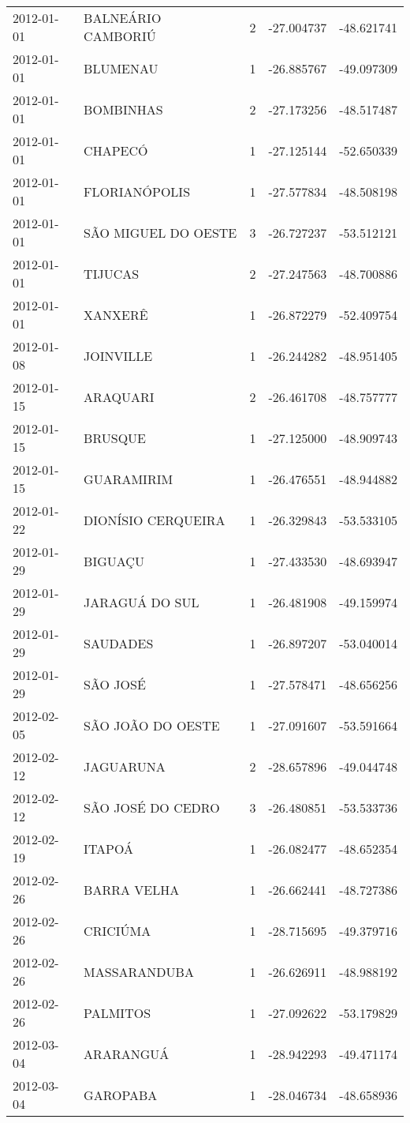\documentclass[
	12pt,				%
	openright,			%
	oneside,			%
	a4paper,			%
	english,			%
	french,				%
	spanish,			%
	brazil				%
	dvipsnames, table]{abntex2}
\begin{document}
\begin{longtable}[htbp]{llcrr}
2012-01-01 & BALNEÁRIO CAMBORIÚ & 2 & -27.004737 & -48.621741 \\
2012-01-01 & BLUMENAU & 1 & -26.885767 & -49.097309 \\
2012-01-01 & BOMBINHAS & 2 & -27.173256 & -48.517487 \\
2012-01-01 & CHAPECÓ & 1 & -27.125144 & -52.650339 \\
2012-01-01 & FLORIANÓPOLIS & 1 & -27.577834 & -48.508198 \\
2012-01-01 & SÃO MIGUEL DO OESTE & 3 & -26.727237 & -53.512121 \\
2012-01-01 & TIJUCAS & 2 & -27.247563 & -48.700886 \\
2012-01-01 & XANXERÊ & 1 & -26.872279 & -52.409754 \\
2012-01-08 & JOINVILLE & 1 & -26.244282 & -48.951405 \\
2012-01-15 & ARAQUARI & 2 & -26.461708 & -48.757777 \\
2012-01-15 & BRUSQUE & 1 & -27.125000 & -48.909743 \\
2012-01-15 & GUARAMIRIM & 1 & -26.476551 & -48.944882 \\
2012-01-22 & DIONÍSIO CERQUEIRA & 1 & -26.329843 & -53.533105 \\
2012-01-29 & BIGUAÇU & 1 & -27.433530 & -48.693947 \\
2012-01-29 & JARAGUÁ DO SUL & 1 & -26.481908 & -49.159974 \\
2012-01-29 & SAUDADES & 1 & -26.897207 & -53.040014 \\
2012-01-29 & SÃO JOSÉ & 1 & -27.578471 & -48.656256 \\
2012-02-05 & SÃO JOÃO DO OESTE & 1 & -27.091607 & -53.591664 \\
2012-02-12 & JAGUARUNA & 2 & -28.657896 & -49.044748 \\
2012-02-12 & SÃO JOSÉ DO CEDRO & 3 & -26.480851 & -53.533736 \\
2012-02-19 & ITAPOÁ & 1 & -26.082477 & -48.652354 \\
2012-02-26 & BARRA VELHA & 1 & -26.662441 & -48.727386 \\
2012-02-26 & CRICIÚMA & 1 & -28.715695 & -49.379716 \\
2012-02-26 & MASSARANDUBA & 1 & -26.626911 & -48.988192 \\
2012-02-26 & PALMITOS & 1 & -27.092622 & -53.179829 \\
2012-03-04 & ARARANGUÁ & 1 & -28.942293 & -49.471174 \\
2012-03-04 & GAROPABA & 1 & -28.046734 & -48.658936 \\

\end{longtable}
\end{document}
